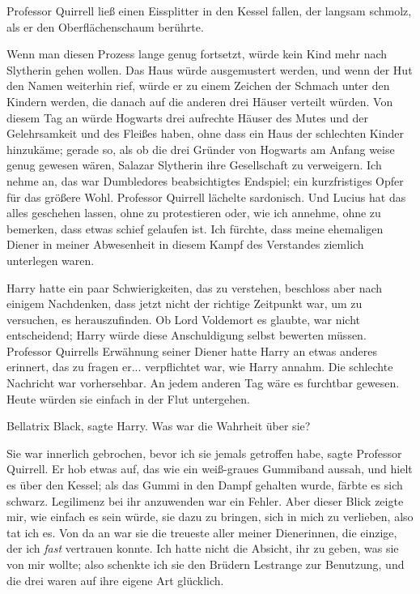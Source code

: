 Professor Quirrell ließ einen Eissplitter in den Kessel fallen, der langsam
schmolz, als er den Oberflächenschaum berührte.

\glqq{}Wenn man diesen Prozess lange genug fortsetzt, würde kein Kind mehr nach
Slytherin gehen wollen. Das Haus würde ausgemustert werden, und wenn der Hut den
Namen weiterhin rief, würde er zu einem Zeichen der Schmach unter den Kindern
werden, die danach auf die anderen drei Häuser verteilt würden. Von diesem Tag
an würde Hogwarts drei aufrechte Häuser des Mutes und der Gelehrsamkeit und des
Fleißes haben, ohne dass ein Haus der schlechten Kinder hinzukäme; gerade so,
als ob die drei Gründer von Hogwarts am Anfang weise genug gewesen wären,
Salazar Slytherin ihre Gesellschaft zu verweigern. Ich nehme an, das war
Dumbledores beabsichtigtes Endspiel; ein kurzfristiges Opfer für das größere
Wohl.\grqq{} Professor Quirrell lächelte sardonisch. \glqq{}Und Lucius hat das alles
geschehen lassen, ohne zu protestieren oder, wie ich annehme, ohne zu bemerken,
dass etwas schief gelaufen ist. Ich fürchte, dass meine ehemaligen Diener in
meiner Abwesenheit in diesem Kampf des Verstandes ziemlich unterlegen waren.\grqq{}

Harry hatte ein paar Schwierigkeiten, das zu verstehen, beschloss aber nach
einigem Nachdenken, dass jetzt nicht der richtige Zeitpunkt war, um zu
versuchen, es herauszufinden. Ob Lord Voldemort es glaubte, war nicht
entscheidend; Harry würde diese Anschuldigung selbst bewerten müssen. Professor
Quirrells Erwähnung seiner Diener hatte Harry an etwas anderes erinnert, das zu
fragen er... verpflichtet war, wie Harry annahm. Die schlechte Nachricht war
vorhersehbar. An jedem anderen Tag wäre es furchtbar gewesen. Heute würden sie
einfach in der Flut untergehen.

\glqq{}Bellatrix Black\grqq{}, sagte Harry. \glqq{}Was war die Wahrheit über sie?\grqq{}

\glqq{}Sie war innerlich gebrochen, bevor ich sie jemals getroffen habe\grqq{},
sagte Professor Quirrell. Er hob etwas auf, das wie ein weiß-graues Gummiband
aussah, und hielt es über den Kessel; als das Gummi in den Dampf gehalten wurde,
färbte es sich schwarz. \glqq{}Legilimenz bei ihr anzuwenden war ein Fehler. Aber
dieser Blick zeigte mir, wie einfach es sein würde, sie dazu zu bringen, sich in
mich zu verlieben, also tat ich es. Von da an war sie die treueste aller meiner
Dienerinnen, die einzige, der ich \emph{fast} vertrauen konnte. Ich hatte nicht
die Absicht, ihr zu geben, was sie von mir wollte; also schenkte ich sie den
Brüdern Lestrange zur Benutzung, und die drei waren auf ihre eigene Art
glücklich.\grqq{}

